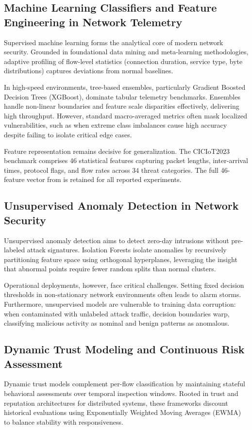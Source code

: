 \documentclass[journal,10pt,onecolumn]{IEEEtran}
\begin{document}
\subsection{Machine Learning Classifiers and Feature Engineering in Network Telemetry}
Supervised machine learning forms the analytical core of modern network security. Grounded in foundational data mining and meta-learning methodologies, adaptive profiling of flow-level statistics (connection duration, service type, byte distributions) captures deviations from normal baselines.

In high-speed environments, tree-based ensembles, particularly Gradient Boosted Decision Trees (XGBoost), dominate tabular telemetry benchmarks. Ensembles handle non-linear boundaries and feature scale disparities effectively, delivering high throughput. However, standard macro-averaged metrics often mask localized vulnerabilities, such as when extreme class imbalances cause high accuracy despite failing to isolate critical edge cases.

Feature representation remains decisive for generalization. The CICIoT2023 benchmark \cite{3} comprises 46 statistical features capturing packet lengths, inter-arrival times, protocol flags, and flow rates across 34 threat categories. The full 46-feature vector from \cite{1} is retained for all reported experiments.

\subsection{Unsupervised Anomaly Detection in Network Security}
Unsupervised anomaly detection aims to detect zero-day intrusions without pre-labeled attack signatures. Isolation Forests isolate anomalies by recursively partitioning feature space using orthogonal hyperplanes, leveraging the insight that abnormal points require fewer random splits than normal clusters.

Operational deployments, however, face critical challenges. Setting fixed decision thresholds in non-stationary network environments often leads to alarm storms. Furthermore, unsupervised models are vulnerable to training data corruption: when contaminated with unlabeled attack traffic, decision boundaries warp, classifying malicious activity as nominal and benign patterns as anomalous.

\subsection{Dynamic Trust Modeling and Continuous Risk Assessment}
Dynamic trust models complement per-flow classification by maintaining stateful behavioral assessments over temporal inspection windows. Rooted in trust and reputation architectures for distributed systems, these frameworks discount historical evaluations using Exponentially Weighted Moving Averages (EWMA) to balance stability with responsiveness.
\end{document}
